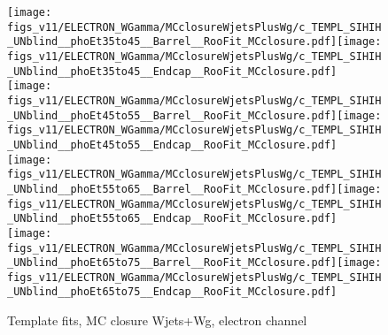 \begin{figure}[htb]
  \begin{center}
   \texttt{[image: figs\_v11/ELECTRON\_WGamma/MCclosureWjetsPlusWg/c\_TEMPL\_SIHIH\_UNblind\_\_phoEt35to45\_\_Barrel\_\_RooFit\_MCclosure.pdf]}\texttt{[image: figs\_v11/ELECTRON\_WGamma/MCclosureWjetsPlusWg/c\_TEMPL\_SIHIH\_UNblind\_\_phoEt35to45\_\_Endcap\_\_RooFit\_MCclosure.pdf]}\\
   \texttt{[image: figs\_v11/ELECTRON\_WGamma/MCclosureWjetsPlusWg/c\_TEMPL\_SIHIH\_UNblind\_\_phoEt45to55\_\_Barrel\_\_RooFit\_MCclosure.pdf]}\texttt{[image: figs\_v11/ELECTRON\_WGamma/MCclosureWjetsPlusWg/c\_TEMPL\_SIHIH\_UNblind\_\_phoEt45to55\_\_Endcap\_\_RooFit\_MCclosure.pdf]}\\
   \texttt{[image: figs\_v11/ELECTRON\_WGamma/MCclosureWjetsPlusWg/c\_TEMPL\_SIHIH\_UNblind\_\_phoEt55to65\_\_Barrel\_\_RooFit\_MCclosure.pdf]}\texttt{[image: figs\_v11/ELECTRON\_WGamma/MCclosureWjetsPlusWg/c\_TEMPL\_SIHIH\_UNblind\_\_phoEt55to65\_\_Endcap\_\_RooFit\_MCclosure.pdf]}\\
   \texttt{[image: figs\_v11/ELECTRON\_WGamma/MCclosureWjetsPlusWg/c\_TEMPL\_SIHIH\_UNblind\_\_phoEt65to75\_\_Barrel\_\_RooFit\_MCclosure.pdf]}\texttt{[image: figs\_v11/ELECTRON\_WGamma/MCclosureWjetsPlusWg/c\_TEMPL\_SIHIH\_UNblind\_\_phoEt65to75\_\_Endcap\_\_RooFit\_MCclosure.pdf]}\\
  \label{fig:templateFits_MCclosureWjetsPlusWg_SIHIH_ELECTRON_2}
  \caption{Template fits, MC closure Wjets+Wg, electron channel}
  \end{center}
\end{figure}

